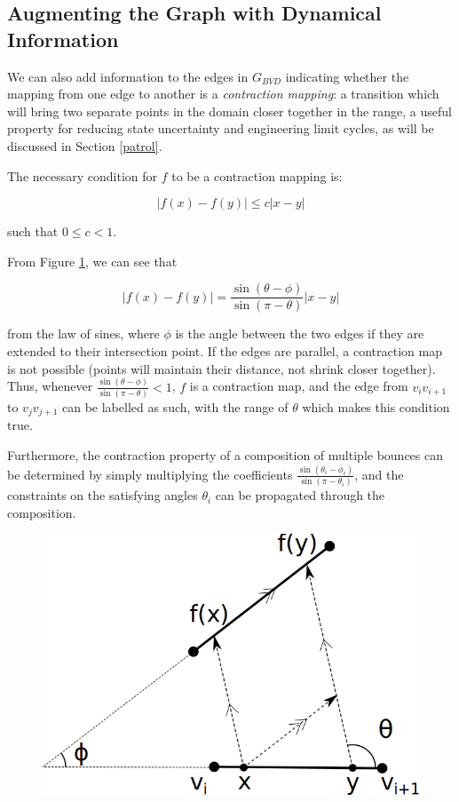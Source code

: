 \documentclass[]{svproc}  %
\begin{document}
\subsection{Augmenting the Graph with Dynamical Information}

We can also add information to the edges in $G_{BVD}$ indicating whether the
mapping from one edge to another is a \emph{contraction mapping}: a transition
which will bring two separate points in the domain closer together in the range,
a useful property for reducing state uncertainty and engineering limit cycles,
as will be discussed in Section \ref{patrol}.

The necessary condition for $f$ to be a contraction mapping is:

\begin{equation*}
|f(x) - f(y)| \leq c |x-y|
\end{equation*}

such that $0 \leq c < 1$.

From Figure \ref{fig:cont_map}, we can see that

\begin{equation*}
|f(x) - f(y)| = \frac{\sin(\theta - \phi)}{\sin(\pi-\theta)} |x-y|
\end{equation*}

from the law of sines, where $\phi$ is the angle between the two edges if they
are extended to their intersection point. If the edges are parallel, a
contraction map is not possible (points will maintain their distance, not shrink
closer together). Thus, whenever $\frac{\sin(\theta - \phi)}{\sin(\pi-\theta)}
< 1$, $f$ is a contraction map, and the edge from $v_i v_{i+1}$ to $v_j
v_{j+1}$ can be labelled as such, with the range of $\theta$ which makes this
condition true.

Furthermore, the contraction property of a composition of multiple bounces can
be determined by simply multiplying the coefficients $\frac{\sin(\theta_i -
\phi_i)}{\sin(\pi-\theta_i)}$, and the constraints on the satisfying angles
$\theta_i$ can be propagated through the composition.

\begin{figure}
    \includegraphics[width=0.8\linewidth]{figures/contraction_map_cond.png}
    \centering
    \caption{\label{fig:cont_map}}
    \centering
\end{figure}
\end{document}
